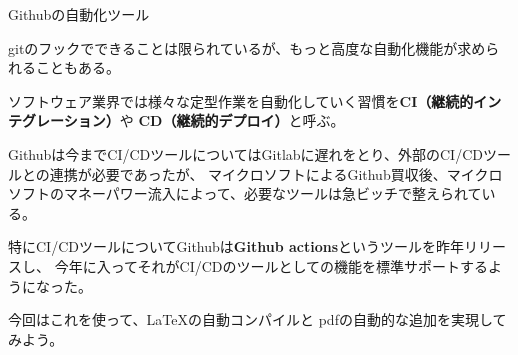 \documentclass[12pt, unicode]{beamer}
\begin{document}
\begin{frame}{Githubの自動化ツール}

gitのフックでできることは限られているが、もっと高度な自動化機能が求められることもある。

ソフトウェア業界では様々な定型作業を自動化していく習慣を\textbf{CI（継続的インテグレーション）}や
\textbf{CD（継続的デプロイ）}と呼ぶ。

Githubは今までCI/CDツールについてはGitlabに遅れをとり、外部のCI/CDツールとの連携が必要であったが、
マイクロソフトによるGithub買収後、マイクロソフトのマネーパワー流入によって、必要なツールは急ビッチで整えられている。

特にCI/CDツールについてGithubは\textbf{Github actions}というツールを昨年リリースし、
今年に入ってそれがCI/CDのツールとしての機能を標準サポートするようになった。

今回はこれを使って、\LaTeX の自動コンパイルと
pdfの自動的な追加を実現してみよう。

\end{frame}
\end{document}
